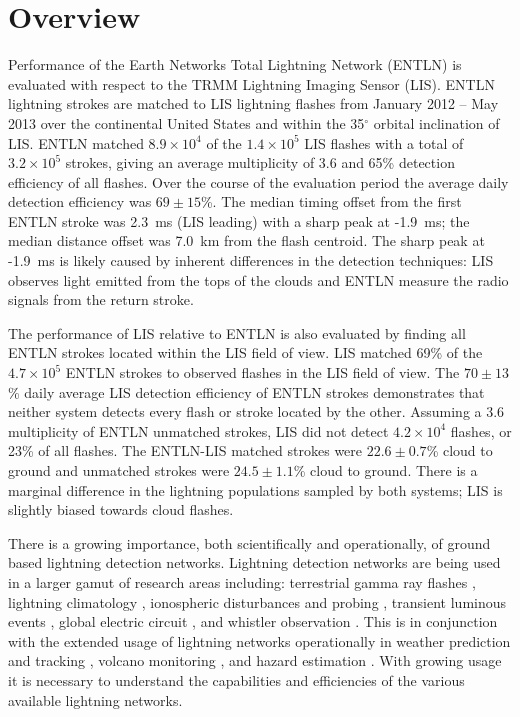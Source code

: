 \section{Overview}

Performance of the Earth Networks Total Lightning Network (ENTLN) is evaluated with respect to the TRMM Lightning Imaging Sensor (LIS).
ENTLN lightning strokes are matched to LIS lightning flashes from January 2012 -- May 2013 over the continental United States and within the 35$^\circ$ orbital inclination of LIS.
ENTLN matched $8.9\times10^4$ of the $1.4\times10^5$ LIS flashes with a total of $3.2\times10^5$ strokes, giving an average multiplicity of 3.6 and 65\% detection efficiency of all flashes.
Over the course of the evaluation period the average daily detection efficiency was $69\pm15$\%.
The median timing offset from the first ENTLN stroke was 2.3~ms (LIS leading) with a sharp peak at -1.9~ms; the median distance offset was 7.0~km from the flash centroid.
The sharp peak at -1.9~ms is likely caused by inherent differences in the detection techniques: LIS observes light emitted from the tops of the clouds and ENTLN measure the radio signals from the return stroke.

The performance of LIS relative to ENTLN is also evaluated by finding all ENTLN strokes located within the LIS field of view.
LIS matched 69\% of the $4.7\times10^5$ ENTLN strokes to observed flashes in the LIS field of view.
The $70\pm13$\% daily average LIS detection efficiency of ENTLN strokes demonstrates that neither system detects every flash or stroke located by the other.
Assuming a 3.6 multiplicity of ENTLN unmatched strokes, LIS did not detect $4.2\times10^4$ flashes, or 23\% of all flashes.
The ENTLN-LIS matched strokes were $22.6\pm0.7$\% cloud to ground and unmatched strokes were $24.5\pm1.1$\% cloud to ground.
There is a marginal difference in the lightning populations sampled by both systems;  LIS is slightly biased towards cloud flashes.

There is a growing importance, both scientifically and operationally, of ground based lightning detection networks.
Lightning detection networks are being used in a larger gamut of research areas including: terrestrial gamma ray flashes \citep{Dwyer2012, Gjesteland2011, Connaughton2010}, lightning climatology \citep{Virts2013, Virts2011a, Burgesser2012}, ionospheric disturbances and probing \citep{Jacobson2010, Singh2011}, transient luminous events \citep{Soula2011}, global electric circuit  \citep{Holzworth2005}, and whistler observation \citep{Collier2010, Collier2011a, Burkholder2013}.
This is in conjunction with the extended usage of lightning networks operationally in weather prediction and tracking \citep{Fierro2012, Pan2010, Thomas2010d}, volcano monitoring \citep{Doughton2010}, and hazard estimation \citep{Altaratz2010}.
With growing usage it is necessary to understand the capabilities and efficiencies of the various available lightning networks.

